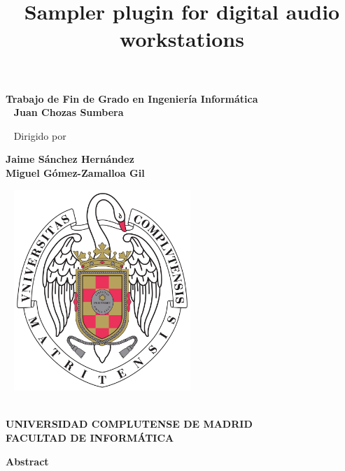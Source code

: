 \documentclass[12pt , a4paper]{article}
\title{\textbf{Sampler plugin for digital audio workstations}}
\date{\vspace{-10ex}}
\begin{document}
	\maketitle
	\begin{center}
		\textbf{Trabajo de Fin de Grado en Ingeniería Informática}\\
		
		~\newline
		\textbf{\large{Juan Chozas Sumbera}}
		
		~\newline
		Dirigido por
		
		\textbf{Jaime Sánchez Hernández\\
		Miguel Gómez-Zamalloa Gil}
		
		
		~\newline
		\includegraphics[width=0.5\textwidth]{logo_UCM.png}\\
		~\newline
		
		\textbf{\large{UNIVERSIDAD COMPLUTENSE DE MADRID}}\\
		
		\textbf{FACULTAD DE INFORMÁTICA}
	\end{center}

	
	
	\newpage

	
	\newpage
	\huge
	\textbf{Abstract}\\
\end{document}
